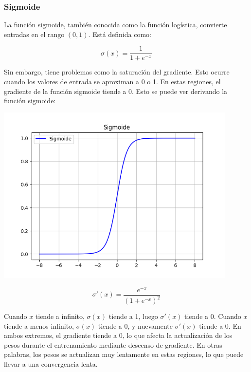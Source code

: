 \subsubsection*{Sigmoide}

\begin{minipage}{0.6\textwidth}
    La función sigmoide, también conocida como la función logística, convierte entradas en el rango $(0, 1)$. Está definida como:

\begin{equation}
\sigma(x) = \frac{1}{1 + e^{-x}} \label{eq:sigmoid}
\end{equation}

Sin embargo, tiene problemas como la saturación del gradiente. Esto ocurre cuando los valores de entrada se aproximan a 0 o 1. En estas regiones, el gradiente de la función sigmoide tiende a 0. Esto se puede ver derivando la función sigmoide:

\end{minipage}
\begin{minipage}{0.05\textwidth}
\textbf{ }
\end{minipage}
\begin{minipage}{0.35\textwidth}
    \includegraphics[width=0.9\textwidth]{img/Sigmoide.png}
    \label{img: sigmoide}
\end{minipage}

\begin{equation}
\sigma'(x) = \frac{e^{-x}}{(1 + e^{-x})^2}
\end{equation}

Cuando $x$ tiende a infinito, $\sigma(x)$ tiende a 1, luego $\sigma'(x)$ tiende a 0. Cuando $x$ tiende a menos infinito, $\sigma(x)$ tiende a 0, y nuevamente $\sigma'(x)$ tiende a 0. En ambos extremos, el gradiente tiende a 0, lo que afecta la actualización de los pesos durante el entrenamiento mediante descenso de gradiente. En otras palabras, los pesos se actualizan muy lentamente en estas regiones, lo que puede llevar a una convergencia lenta.

